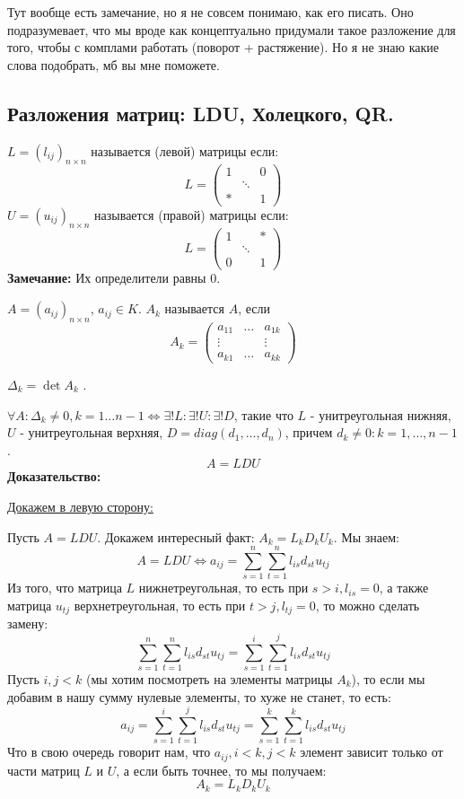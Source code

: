 Тут вообще есть замечание, но я не совсем понимаю, как его писать. Оно подразумевает, что мы вроде как концептуально придумали такое разложение для того, чтобы с комплами работать (поворот + растяжение). Но я не знаю какие слова подобрать, мб вы мне поможете.

\pagebreak
\subsection{Разложения матриц: LDU, Холецкого, QR.}

 $L = (l_{ij})_{n\times n}$  называется  (левой) матрицы если:
$$L = \begin{pmatrix}
    1 & & 0\\
    & \ddots & \\
    * &  & 1 
\end{pmatrix}$$
 $U = (u_{ij})_{n\times n}$  называется  (правой) матрицы если: 
$$L = \begin{pmatrix}
    1 & & *\\
    & \ddots & \\
    0 &  & 1 
\end{pmatrix}$$
\textbf{Замечание:} Их определители равны 0.

 $A = (a_{ij})_{n \times n}$, $a_{ij} \in K$. $A_k$ называется  $A$, если
$$A_k = \begin{pmatrix}
    a_{11} & \ldots & a_{1k}\\
    \vdots & & \vdots \\
    a_{k1} & \ldots & a_{kk}
\end{pmatrix}$$

$\Delta_k = \det A_k $ .



$\forall A : \Delta_k \neq 0 , k = 1\ldots n-1 \Leftrightarrow \exists ! L : \exists! U: \exists ! D $, такие что $L$ - унитреугольная нижняя, $U$ - унитреугольная верхняя, $D = diag (d_1,\ldots, d_n)$, причем $d_k \neq 0: k = 1,\ldots,n-1$.
$$A = LDU$$
\textbf{Доказательство:}

    \uline{Докажем в левую сторону:}

    Пусть $A  = LDU$.  Докажем интересный факт:  $A_k = L_k D_k U_k$. Мы знаем:
    $$A = LDU \Leftrightarrow a_{ij} = \sum\limits_{s =1 }^n \sum\limits_{t=1}^n l_{is}d_{st} u_{tj}$$
    Из того, что матрица $L$ нижнетреугольная, то есть при $s> i , l_{is} = 0$, а также матрица $u_{tj}$ верхнетреугольная, то есть при $t>j, l_{tj}=0$, то можно сделать замену:
    $$\sum\limits_{s =1 }^n \sum\limits_{t=1}^n l_{is}d_{st} u_{tj} = \sum\limits_{s =1 }^i \sum\limits_{t=1}^j l_{is}d_{st} u_{tj}$$
    Пусть $i,j < k$ (мы хотим посмотреть на элементы матрицы $A_k$), то если мы добавим в нашу сумму нулевые элементы, то хуже не станет, то есть:
    $$a_{ij} =  \sum\limits_{s =1 }^i \sum\limits_{t=1}^j l_{is}d_{st} u_{tj} = \sum\limits_{s =1 }^k \sum\limits_{t=1}^k l_{is}d_{st} u_{tj}$$
    Что в свою очередь говорит нам, что $a_{ij}, i<k,j<k$ элемент зависит только  от части матриц $L$ и $U$, а если быть точнее, то мы получаем:
    $$A_k = L_k D_k U_k$$


